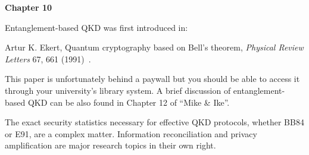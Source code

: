 {\bf Chapter 10}

Entanglement-based QKD was first introduced in:

Artur K. Ekert, Quantum cryptography based on Bell’s theorem, \emph{Physical Review Letters} 67, 661 (1991)~\cite{ekert1991qcb}.

This paper is unfortunately behind a paywall but you should be able to access it through your university’s library system.
A brief discussion of entanglement-based QKD can be also found in Chapter 12 of “Mike \& Ike”.

The exact security statistics necessary for effective QKD protocols, whether BB84 or E91, are a complex matter.  Information reconciliation and privacy amplification are major research topics in their own right.
